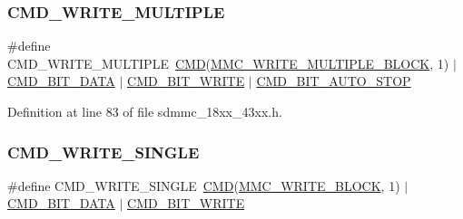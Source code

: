 \subsubsection{\texorpdfstring{C\+M\+D\+\_\+\+W\+R\+I\+T\+E\+\_\+\+M\+U\+L\+T\+I\+P\+LE}{CMD\_WRITE\_MULTIPLE}}
{\footnotesize\ttfamily \#define C\+M\+D\+\_\+\+W\+R\+I\+T\+E\+\_\+\+M\+U\+L\+T\+I\+P\+LE~\hyperlink{group___s_d_m_m_c__18_x_x__43_x_x_ga7caafa608408eea45aca375d0d5eb211}{C\+MD}(\hyperlink{group___c_h_i_p___s_d_m_m_c___definitions_ga791b2d417011f16319822320507e69fb}{M\+M\+C\+\_\+\+W\+R\+I\+T\+E\+\_\+\+M\+U\+L\+T\+I\+P\+L\+E\+\_\+\+B\+L\+O\+CK}, 1) $\vert$ \hyperlink{group___s_d_m_m_c__18_x_x__43_x_x_gac4b629fb5a202bac675389cf3e28a197}{C\+M\+D\+\_\+\+B\+I\+T\+\_\+\+D\+A\+TA} $\vert$ \hyperlink{group___s_d_m_m_c__18_x_x__43_x_x_ga78e0e4e25dd9e13cdcbecc9f396b2150}{C\+M\+D\+\_\+\+B\+I\+T\+\_\+\+W\+R\+I\+TE} $\vert$ \hyperlink{group___s_d_m_m_c__18_x_x__43_x_x_ga54467a0e80fd68c54419d4e6598c05d8}{C\+M\+D\+\_\+\+B\+I\+T\+\_\+\+A\+U\+T\+O\+\_\+\+S\+T\+OP}}



Definition at line 83 of file sdmmc\+\_\+18xx\+\_\+43xx.\+h.

\mbox{\label{group___s_d_m_m_c__18_x_x__43_x_x_ga41a9ae4efad0a16a54114133fe95dafb}} 
\subsubsection{\texorpdfstring{C\+M\+D\+\_\+\+W\+R\+I\+T\+E\+\_\+\+S\+I\+N\+G\+LE}{CMD\_WRITE\_SINGLE}}
{\footnotesize\ttfamily \#define C\+M\+D\+\_\+\+W\+R\+I\+T\+E\+\_\+\+S\+I\+N\+G\+LE~\hyperlink{group___s_d_m_m_c__18_x_x__43_x_x_ga7caafa608408eea45aca375d0d5eb211}{C\+MD}(\hyperlink{group___c_h_i_p___s_d_m_m_c___definitions_ga991d94c3be5fd4548d5bb222d03500f9}{M\+M\+C\+\_\+\+W\+R\+I\+T\+E\+\_\+\+B\+L\+O\+CK}, 1) $\vert$ \hyperlink{group___s_d_m_m_c__18_x_x__43_x_x_gac4b629fb5a202bac675389cf3e28a197}{C\+M\+D\+\_\+\+B\+I\+T\+\_\+\+D\+A\+TA} $\vert$ \hyperlink{group___s_d_m_m_c__18_x_x__43_x_x_ga78e0e4e25dd9e13cdcbecc9f396b2150}{C\+M\+D\+\_\+\+B\+I\+T\+\_\+\+W\+R\+I\+TE}}




